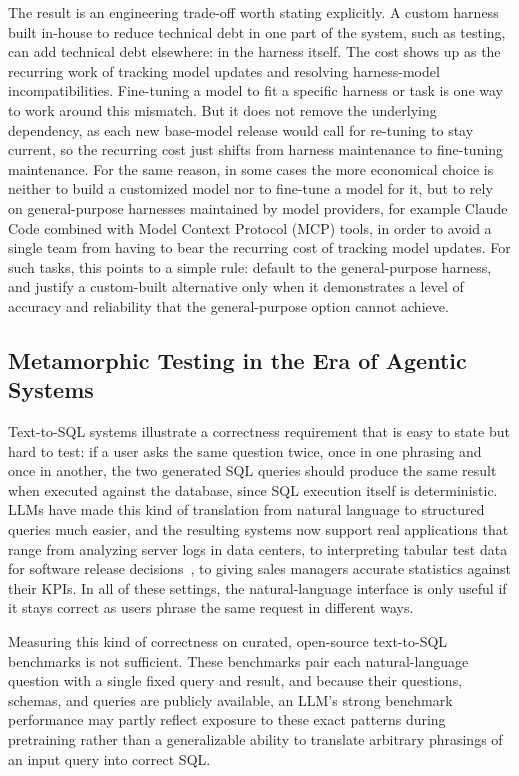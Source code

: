 \documentclass[11pt]{article}
\begin{document}
The result is an engineering trade-off worth stating explicitly. A custom harness built in-house to reduce technical debt in one part of the system, such as testing, can add technical debt elsewhere: in the harness itself. The cost shows up as the recurring work of tracking model updates and resolving harness-model incompatibilities. Fine-tuning a model to fit a specific harness or task is one way to work around this mismatch. But it does not remove the underlying dependency, as each new base-model release would call for re-tuning to stay current, so the recurring cost just shifts from harness maintenance to fine-tuning maintenance. For the same reason, in some cases the more economical choice is neither to build a customized model nor to fine-tune a model for it, but to rely on general-purpose harnesses maintained by model providers, for example Claude Code combined with Model Context Protocol (MCP) tools, in order to avoid a single team from having to bear the recurring cost of tracking model updates. For such tasks, this points to a simple rule: default to the general-purpose harness, and justify a custom-built alternative only when it demonstrates a level of accuracy and reliability that the general-purpose option cannot achieve.

\subsection{Metamorphic Testing in the Era of Agentic Systems}

Text-to-SQL systems illustrate a correctness requirement that is easy to state but hard to test: if a user asks the same question twice, once in one phrasing and once in another, the two generated SQL queries should produce the same result when executed against the database, since SQL execution itself is deterministic. LLMs have made this kind of translation from natural language to structured queries much easier, and the resulting systems now support real applications that range from analyzing server logs in data centers, to interpreting tabular test data for software release decisions~\citep{khoee2026gatelens}, to giving sales managers accurate statistics against their KPIs. In all of these settings, the natural-language interface is only useful if it stays correct as users phrase the same request in different ways.

Measuring this kind of correctness on curated, open-source text-to-SQL benchmarks is not sufficient. These benchmarks pair each natural-language question with a single fixed query and result, and because their questions, schemas, and queries are publicly available, an LLM's strong benchmark performance may partly reflect exposure to these exact patterns during pretraining rather than a generalizable ability to translate arbitrary phrasings of an input query into correct SQL.
\end{document}
